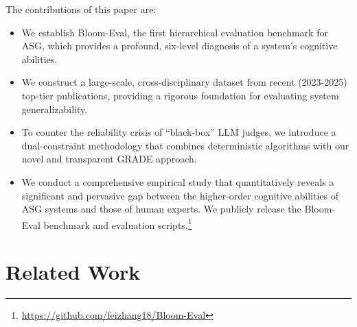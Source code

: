 \documentclass[11pt]{article}
\begin{document}
The contributions of this paper are:
\vspace{-2mm}
\begin{itemize}[itemsep=0pt, parsep=0pt]
    \item We establish Bloom-Eval, the first hierarchical evaluation benchmark for ASG, which provides a profound, six-level diagnosis of a system's cognitive abilities.
    
    \item We construct a large-scale, cross-disciplinary dataset from recent (2023-2025) top-tier publications, providing a rigorous foundation for evaluating system generalizability.
    
    \item To counter the reliability crisis of ``black-box'' LLM judges, we introduce a dual-constraint methodology that combines deterministic algorithms with our novel and transparent GRADE approach.

    \item We conduct a comprehensive empirical study that quantitatively reveals a significant and pervasive gap between the higher-order cognitive abilities of ASG systems and those of human experts. We publicly release the Bloom-Eval benchmark and evaluation scripts.\footnote{\url{https://github.com/feizhang18/Bloom-Eval}}


\end{itemize}

\section{Related Work}
\label{sec:related_work}
\end{document}
